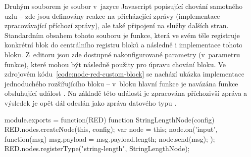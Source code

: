 Druhým souborem je soubor v~jazyce Javascript popisující chování samotného uzlu -- zde jsou definovány reakce na
přicházející zprávy (implementace zpracovávající příchozí zprávy), ale také připojení na služby dalších stran.
Standardním obsahem tohoto souboru je funkce, která ve svém těle registruje konkrétní blok do centrálního registru
bloků a následně i implementace tohoto bloku.
Z~editoru jsou zde dostupné nakonfigurované parametry (v~parametru funkce), které mohou být následně použity pro
úpravu chování bloku.
Ve zdrojovém kódu~\ref{code:node-red-custom-block} se nachází ukázka implementace jednoduchého rozšiřujícího bloku --
v~bloku hlavní funkce je navázána funkce obsluhující událost .
Na základě této události je zpracována příchozivší zpráva a výsledek je opět dál odeslán jako zpráva datového typu
.

\begin{code}[%
    caption={Ukázka implementace vlastního rozšiřujícího bloku do nástroje Node-RED -- uzel s~jedním vstupem a
výstupem, jehož funkcí je určení délky příchozí zprávy (řetězce).
\emph{Implementace pro jednoduchost neobsahuje kontrolu datových typů či práci s~konfiguračními parametry uzlu.}},
    label=code:node-red-custom-block,
    language=Javascript
]
module.exports = function(RED) {
    function StringLengthNode(config) {
        RED.nodes.createNode(this, config);
        var node = this;
        node.on('input', function(msg) {
            msg.payload = msg.payload.length;
            node.send(msg);
        });
    }
    RED.nodes.registerType("string-length", StringLengthNode);
}
\end{code}


